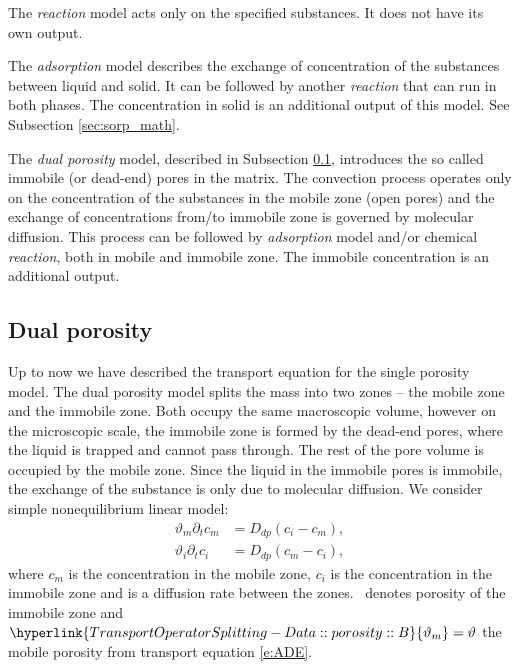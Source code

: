 The \emph{reaction} model acts only on the specified substances. It does not have its own output.

The \emph{adsorption} model describes the exchange of concentration of the substances between liquid and solid. It can be
followed by another \emph{reaction} that can run in both phases. The concentration in solid is an additional output 
of this model. See Subsection \ref{sec:sorp_math}.


The \emph{dual porosity} model, described in Subsection \ref{sec:dual_porosity}, introduces the so called immobile (or dead-end) pores in the matrix. The convection process operates only on the concentration of the substances in the mobile zone (open pores) 
and the exchange of concentrations from/to immobile zone is governed by molecular diffusion. This process can be followed by 
\emph{adsorption} model and/or chemical \emph{reaction}, both in mobile and immobile zone. The immobile concentration is an
additional output.


\subsection{Dual porosity}
\label{sec:dual_porosity}

Up to now we have described the transport equation for the single porosity model. The dual porosity model splits the mass into 
two zones -- the mobile zone and the immobile zone. Both occupy the same macroscopic volume, however on the microscopic scale, 
the immobile zone is formed by the dead-end pores, where the liquid is trapped and cannot pass through. The rest of the pore volume 
is occupied by the mobile zone. Since the liquid in the immobile pores is immobile, the exchange of the substance is only due 
to molecular diffusion. We consider simple nonequilibrium linear model:
\begin{align}
    \vartheta_m \partial_t c_m &= D_{dp} ( c_i - c_m), \label{eqn:dual_porosity_ode1}\\
    \vartheta_i \partial_t c_i &= D_{dp} ( c_m - c_i), \label{eqn:dual_porosity_ode2}
\end{align}
where $c_m$ is the concentration in the mobile zone, $c_i$ is the concentration in the immobile zone and
 is a diffusion rate between the zones.
~denotes porosity of the immobile zone  and 
$\hyperlink{TransportOperatorSplitting-Data::porosity::B}{\vartheta_m} = \vartheta$ the mobile porosity from transport equation \eqref{e:ADE}.

